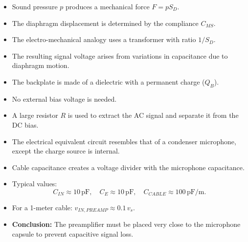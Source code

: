 \begin{tcolorbox}[colback=gray!10!white,colframe=black,title=\textbf{Summary – Condenser Microphone Model}]
\begin{itemize}
    \item Sound pressure \( p \) produces a mechanical force \( F = p S_D \).
    \item The diaphragm displacement is determined by the compliance \( C_{MS} \).
    \item The electro-mechanical analogy uses a transformer with ratio \( 1/S_D \).
    \item The resulting signal voltage arises from variations in capacitance due to diaphragm motion.
\end{itemize}
\end{tcolorbox}


\begin{tcolorbox}[colback=gray!10!white,colframe=black,title=\textbf{Summary – Electret Microphone Principle}]
\begin{itemize}
    \item The backplate is made of a dielectric with a permanent charge (\( Q_B \)).
    \item No external bias voltage is needed.
    \item A large resistor \( R \) is used to extract the AC signal and separate it from the DC bias.
    \item The electrical equivalent circuit resembles that of a condenser microphone, except the charge source is internal.
\end{itemize}
\end{tcolorbox}

\begin{tcolorbox}[colback=gray!10!white,colframe=black,title=\textbf{Summary – Cable Influence}]
\begin{itemize}
    \item Cable capacitance creates a voltage divider with the microphone capacitance.
    \item Typical values:
    \[
    C_{IN} \approx 10\,\text{pF}, \quad C_E \approx 10\,\text{pF}, \quad C_{CABLE} \approx 100\,\text{pF/m}.
    \]
    \item For a 1-meter cable: \( v_{IN,PREAMP} \approx 0.1\,v_s \).
    \item \textbf{Conclusion:} The preamplifier must be placed very close to the microphone capsule to prevent capacitive signal loss.
\end{itemize}
\end{tcolorbox}

